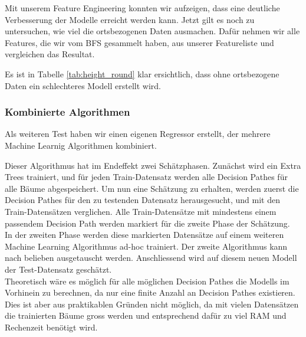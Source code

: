 Mit unserem Feature Engineering konnten wir aufzeigen, dass eine deutliche Verbesserung der Modelle erreicht werden kann. Jetzt gilt es noch zu untersuchen, wie viel die ortsbezogenen Daten ausmachen. Dafür nehmen wir alle Features, die wir vom BFS gesammelt haben, aus unserer Featureliste und vergleichen das Resultat.

\begin{table}[ht]
\centering
{}
\caption{Ergebnisse ohne ortsbezogenen Daten vom BFS}
\label{tab:height_round}
\end{table}

Es ist in Tabelle \ref{tab:height_round} klar ersichtlich, dass ohne ortsbezogene Daten ein schlechteres Modell erstellt wird.

\subsubsection{Kombinierte Algorithmen}
Als weiteren Test haben wir einen eigenen Regressor erstellt, der mehrere Machine Learnig Algorithmen kombiniert.

Dieser Algorithmus hat im Endeffekt zwei Schätzphasen. Zunächst wird ein Extra Trees trainiert, und für jeden Train-Datensatz werden alle Decision Pathes für alle Bäume abgespeichert. Um nun eine Schätzung zu erhalten, werden zuerst die Decision Pathes für den zu testenden Datensatz herausgesucht, und mit den Train-Datensätzen verglichen. Alle Train-Datensätze mit mindestens einem passendem Decision Path werden markiert für die zweite Phase der Schätzung.\\
In der zweiten Phase werden diese markierten Datensätze auf einem weiteren Machine Learning Algorithmus ad-hoc trainiert. Der zweite Algorithmus kann nach belieben ausgetauscht werden. Anschliessend wird auf diesem neuen Modell der Test-Datensatz geschätzt.\\
Theoretisch wäre es möglich für alle möglichen Decision Pathes die Modells im Vorhinein zu berechnen, da nur eine finite Anzahl an Decision Pathes existieren. Dies ist aber aus praktikablen Gründen nicht möglich, da mit vielen Datensätzen die trainierten Bäume gross werden und entsprechend  dafür zu viel RAM und Rechenzeit benötigt wird.

